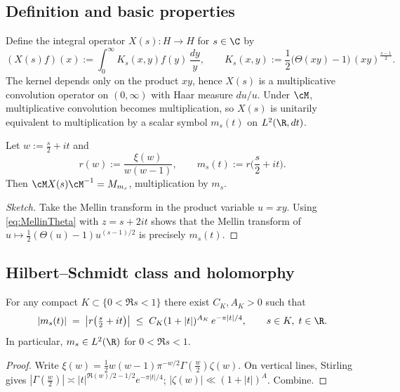\subsection{Definition and basic properties}
Define the integral operator \(X(s):H\to H\) for \(s\in\C\) by
\begin{equation}\label{eq:Xkernel}
(X(s)f)(x) := \int_0^\infty K_s(x,y) f(y)\,\frac{dy}{y},\qquad
K_s(x,y):=\frac12\big(\Theta(xy)-1\big)\,(xy)^{\frac{s-1}{2}}.
\end{equation}
The kernel depends only on the product \(xy\), hence \(X(s)\) is a multiplicative convolution operator on \((0,\infty)\) with Haar measure \(du/u\). Under \(\cM\), multiplicative convolution becomes multiplication, so \(X(s)\) is unitarily equivalent to multiplication by a scalar symbol \(m_s(t)\) on \(L^2(\R,dt)\).

\begin{lemma}\label{lem:Diagonalization}
Let \(w:=\tfrac{s}{2}+it\) and
\begin{equation}\label{eq:symbol}
r(w):=\frac{\xi(w)}{w(w-1)},\qquad m_s(t):=r\Big(\frac{s}{2}+it\Big).
\end{equation}
Then \(\cM X(s)\cM^{-1} = M_{m_s}\), multiplication by \(m_s\).
\end{lemma}

\begin{proof}[Sketch]
Take the Mellin transform in the product variable \(u=xy\). Using \eqref{eq:MellinTheta} with \(z=s+2it\) shows that the Mellin transform of \(u\mapsto \frac12(\Theta(u)-1)u^{(s-1)/2}\) is precisely \(m_s(t)\).
\end{proof}

\subsection{Hilbert--Schmidt class and holomorphy}

\begin{lemma}\label{lem:HSBound}
For any compact \(K\subset \{0<\Re s<1\}\) there exist \(C_K,A_K>0\) such that
\begin{equation}\label{eq:decay}
|m_s(t)| \;=\; \left| r\!\left(\tfrac{s}{2}+it\right)\right|
\;\le\; C_K (1+|t|)^{A_K}\, e^{-\pi|t|/4},\qquad s\in K,\; t\in\R.
\end{equation}
In particular, \(m_s\in L^2(\R)\) for \(0<\Re s<1\).
\end{lemma}

\begin{proof}
Write \(\xi(w)=\frac12 w(w-1)\pi^{-w/2}\Gamma(\tfrac{w}{2})\zeta(w)\). On vertical lines, Stirling gives \(|\Gamma(\tfrac{w}{2})|\asymp |t|^{\Re(w)/2-1/2} e^{-\pi|t|/4}\); \(|\zeta(w)|\ll (1+|t|)^A\). Combine.
\end{proof}

